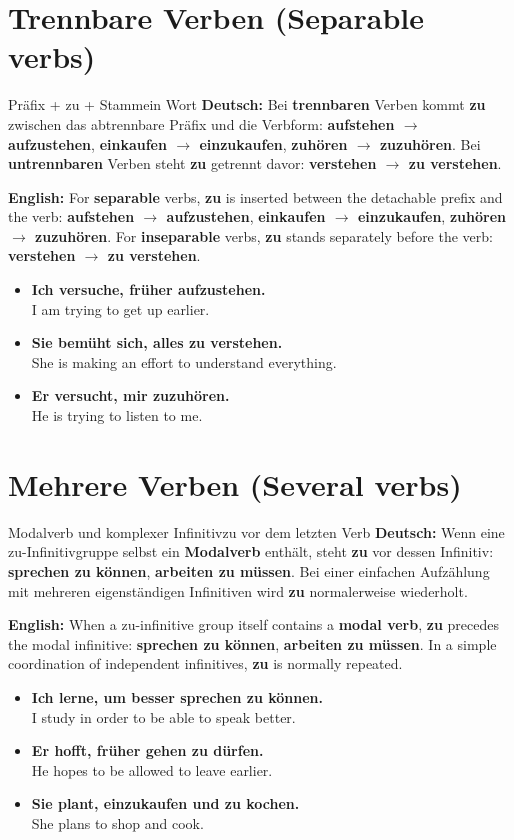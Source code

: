 \documentclass[a4paper,11pt]{article}
\newcommand{\GermanText}[1]{\textbf{Deutsch: }#1\par}
\newcommand{\EnglishText}[1]{{\small\color{SoftGray}\textbf{English: }#1\par}}
\newcommand{\ExampleItem}[2]{\item \textbf{#1}\\{\small\color{SoftGray}#2}}
\begin{document}
\section{Trennbare Verben \textnormal{(Separable verbs)}}
\begin{grammarentry}{Präfix + zu + Stamm}{ein Wort}
\GermanText{Bei \textbf{trennbaren} Verben kommt \textbf{zu} zwischen das abtrennbare Präfix und die Verbform: \textbf{aufstehen $\rightarrow$ aufzustehen}, \textbf{einkaufen $\rightarrow$ einzukaufen}, \textbf{zuhören $\rightarrow$ zuzuhören}. Bei \textbf{untrennbaren} Verben steht \textbf{zu} getrennt davor: \textbf{verstehen $\rightarrow$ zu verstehen}.}
\EnglishText{For \textbf{separable} verbs, \textbf{zu} is inserted between the detachable prefix and the verb: \textbf{aufstehen $\rightarrow$ aufzustehen}, \textbf{einkaufen $\rightarrow$ einzukaufen}, \textbf{zuhören $\rightarrow$ zuzuhören}. For \textbf{inseparable} verbs, \textbf{zu} stands separately before the verb: \textbf{verstehen $\rightarrow$ zu verstehen}.}
\end{grammarentry}
\begin{exbox}\begin{itemize}
\ExampleItem{Ich versuche, früher aufzustehen.}{I am trying to get up earlier.}
\ExampleItem{Sie bemüht sich, alles zu verstehen.}{She is making an effort to understand everything.}
\ExampleItem{Er versucht, mir zuzuhören.}{He is trying to listen to me.}
\end{itemize}\end{exbox}

\section{Mehrere Verben \textnormal{(Several verbs)}}
\begin{grammarentry}{Modalverb und komplexer Infinitiv}{zu vor dem letzten Verb}
\GermanText{Wenn eine zu-Infinitivgruppe selbst ein \textbf{Modalverb} enthält, steht \textbf{zu} vor dessen Infinitiv: \textbf{sprechen zu können}, \textbf{arbeiten zu müssen}. Bei einer einfachen Aufzählung mit mehreren eigenständigen Infinitiven wird \textbf{zu} normalerweise wiederholt.}
\EnglishText{When a zu-infinitive group itself contains a \textbf{modal verb}, \textbf{zu} precedes the modal infinitive: \textbf{sprechen zu können}, \textbf{arbeiten zu müssen}. In a simple coordination of independent infinitives, \textbf{zu} is normally repeated.}
\end{grammarentry}
\begin{exbox}\begin{itemize}
\ExampleItem{Ich lerne, um besser sprechen zu können.}{I study in order to be able to speak better.}
\ExampleItem{Er hofft, früher gehen zu dürfen.}{He hopes to be allowed to leave earlier.}
\ExampleItem{Sie plant, einzukaufen und zu kochen.}{She plans to shop and cook.}
\end{itemize}\end{exbox}
\end{document}

